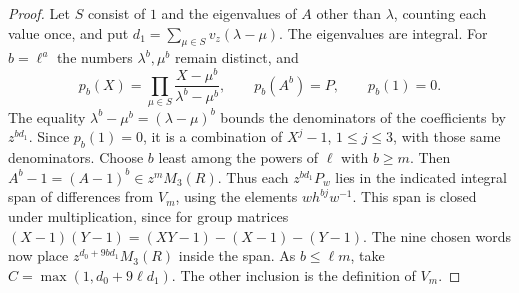 \documentclass[a4paper,11pt]{article}
\theoremstyle{definition}
\theoremstyle{remark}
\numberwithin{equation}{section}
\begin{document}
\begin{proof}
Let \(S\) consist of \(1\) and the eigenvalues of \(A\) other than
\(\lambda\), counting each value once, and put
\(d_1=\sum_{\mu\in S}v_z(\lambda-\mu)\). The eigenvalues are integral.
For \(b=\ell^a\) the numbers \(\lambda^b,\mu^b\) remain distinct, and
\[
 p_b(X)=\prod_{\mu\in S}\frac{X-\mu^b}{\lambda^b-\mu^b},
 \qquad p_b(A^b)=P,\qquad p_b(1)=0.
\]
The equality \(\lambda^b-\mu^b=(\lambda-\mu)^b\) bounds the
denominators of the coefficients by \(z^{bd_1}\). Since \(p_b(1)=0\),
it is a combination of \(X^j-1\), \(1\le j\le3\), with those same
denominators. Choose \(b\) least among the powers of \(\ell\) with
\(b\ge m\). Then \(A^b-1=(A-1)^b\in z^m M_3(R)\). Thus each
\(z^{bd_1}P_w\) lies in the indicated integral span of differences
from \(V_m\), using the elements \(w h^{bj}w^{-1}\). This span is
closed under multiplication, since for group matrices
\((X-1)(Y-1)=(XY-1)-(X-1)-(Y-1)\). The nine chosen words now place
\(z^{d_0+9bd_1}M_3(R)\) inside the span. As \(b\le\ell m\), take
\(C=\max(1,d_0+9\ell d_1)\). The other inclusion is the definition of
\(V_m\).
\end{proof}
\end{document}

